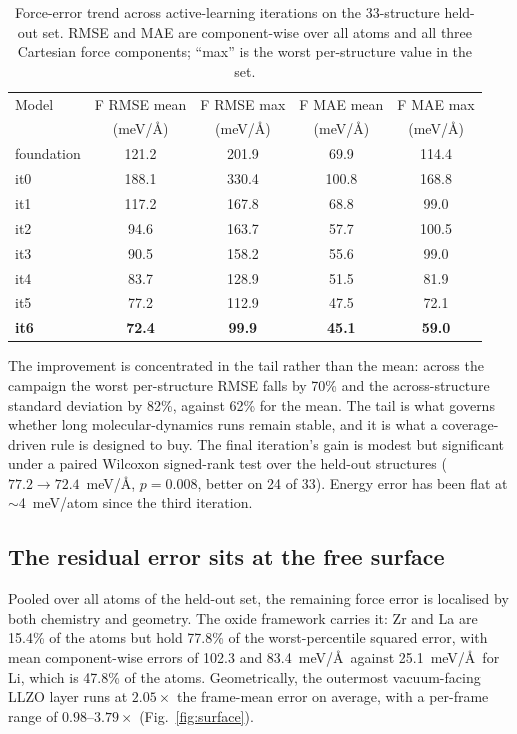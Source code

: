 \documentclass[11pt]{article}
\begin{document}
\begin{table}[htbp]
\centering
\caption{Force-error trend across active-learning iterations on the
33-structure held-out set. RMSE and MAE are component-wise over all atoms and
all three Cartesian force components; ``max'' is the worst per-structure value
in the set.}
\label{tab:force-trend}
\begin{tabular}{lcccc}
\toprule
Model & F RMSE mean & F RMSE max & F MAE mean & F MAE max \\
 & (meV/\AA) & (meV/\AA) & (meV/\AA) & (meV/\AA) \\
\midrule
foundation              & 121.2 & 201.9 & 69.9  & 114.4 \\
it0                     & 188.1 & 330.4 & 100.8 & 168.8 \\
it1                     & 117.2 & 167.8 & 68.8  & 99.0  \\
it2                     & 94.6  & 163.7 & 57.7  & 100.5 \\
it3                     & 90.5  & 158.2 & 55.6  & 99.0  \\
it4                     & 83.7  & 128.9 & 51.5  & 81.9  \\
it5                     & 77.2  & 112.9 & 47.5  & 72.1  \\
\textbf{it6}            & \textbf{72.4} & \textbf{99.9} & \textbf{45.1} & \textbf{59.0} \\
\bottomrule
\end{tabular}
\end{table}

The improvement is concentrated in the tail rather than the mean: across the
campaign the worst per-structure RMSE falls by 70\% and the across-structure
standard deviation by 82\%, against 62\% for the mean. The tail is what governs
whether long molecular-dynamics runs remain stable, and it is what a
coverage-driven rule is designed to buy. The final iteration's gain is modest
but significant under a paired Wilcoxon signed-rank test over the held-out
structures ($77.2\rightarrow72.4$~meV/\AA, $p=0.008$, better on 24 of 33).
Energy error has been flat at $\sim$4~meV/atom since the third iteration.

\subsection{The residual error sits at the free surface}

Pooled over all atoms of the held-out set, the remaining force error is
localised by both chemistry and geometry. The oxide framework carries it: Zr
and La are 15.4\% of the atoms but hold 77.8\% of the worst-percentile squared
error, with mean component-wise errors of 102.3 and 83.4~meV/\AA\ against
25.1~meV/\AA\ for Li, which is 47.8\% of the atoms. Geometrically, the
outermost vacuum-facing LLZO layer runs at $2.05\times$ the frame-mean error on
average, with a per-frame range of $0.98$--$3.79\times$ (Fig.~\ref{fig:surface}).
\end{document}
